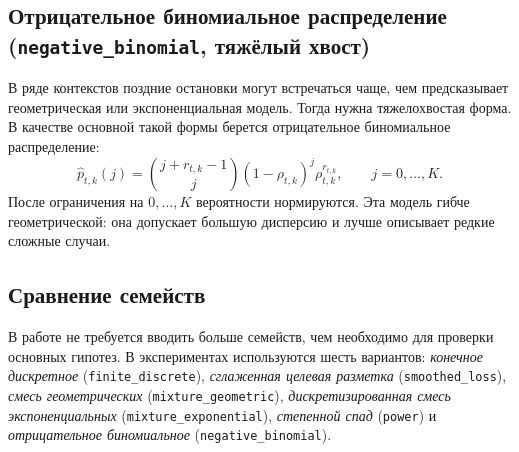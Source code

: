 \subsection{Отрицательное биномиальное распределение (\texttt{negative\_binomial}, тяжёлый хвост)}

В ряде контекстов поздние остановки могут встречаться чаще, чем предсказывает геометрическая или
экспоненциальная модель. Тогда нужна тяжелохвостая форма. В качестве основной такой формы берется
отрицательное биномиальное распределение:
\begin{equation}
  \widehat p_{t,k}(j)=
  \binom{j+r_{t,k}-1}{j}(1-\rho_{t,k})^j\rho_{t,k}^{r_{t,k}},
  \qquad j=0,\ldots,K.
  \label{eq:negative_binomial}
\end{equation}
После ограничения на \(0,\ldots,K\) вероятности нормируются. Эта модель гибче геометрической: она
допускает большую дисперсию и лучше описывает редкие сложные случаи.

\subsection{Сравнение семейств}

В работе не требуется вводить больше семейств, чем необходимо для проверки основных гипотез. В
экспериментах используются шесть вариантов: \emph{конечное дискретное}
(\texttt{finite\_discrete}), \emph{сглаженная целевая разметка} (\texttt{smoothed\_loss}), \emph{смесь
геометрических} (\texttt{mixture\_geometric}), \emph{дискретизированная смесь экспоненциальных}
(\texttt{mixture\_exponential}), \emph{степенной спад} (\texttt{power}) и \emph{отрицательное
биномиальное} (\texttt{negative\_binomial}).